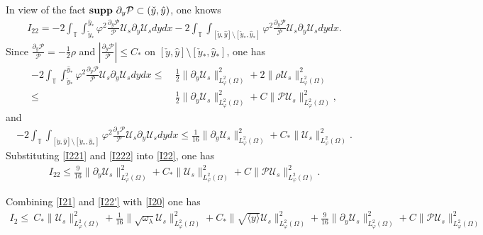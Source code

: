 \documentclass{amsart}
\numberwithin{equation}{section}
\newcommand\y{{{\langle y \rangle}}}
\begin{document}
In view of the fact ${\bf supp}~\partial_{y}\mathcal{P}\subset(\check{y},\hat{y})$, one knows
\begin{align}\label{I22}
I_{22}
=-2\int_{\mathbb{T}}\int_{\check{y}_{*}}^{\hat{y}_{*}}\varphi^{2}\frac{\partial_{y}\mathcal{P}}{\mathcal{P}}\mathcal{U}_{s}\partial_{y}\mathcal{U}_{s}dydx
 -2\int_{\mathbb{T}}\int_{[\check{y},\hat{y}]\setminus[\check{y}_{*},\hat{y}_{*}]}\varphi^{2}\frac{\partial_{y}\mathcal{P}}{\mathcal{P}}\mathcal{U}_{s}\partial_{y}\mathcal{U}_{s}dydx.
\end{align}
Since $\frac{\partial_{y}\mathcal{P}}{\mathcal{P}}=-\frac{1}{2}\rho$
and $\left|\frac{\partial_{y}\mathcal{P}}{\mathcal{P}}\right|\leq C_{*}$ on $[\check{y},\hat{y}]\setminus[\check{y}_{*},\hat{y}_{*}]$, one has
\begin{align}\label{I221}
-2\int_{\mathbb{T}}\int_{\check{y}_{*}}^{\hat{y}_{*}}\varphi^{2}\frac{\partial_{y}\mathcal{P}}{\mathcal{P}}\mathcal{U}_{s}\partial_{y}\mathcal{U}_{s}dydx
\leq&~\frac{1}{2}\|\partial_{y}\mathcal{U}_{s}\|_{L_{\varphi}^{2}(\Omega)}^{2}
     +2\|\rho\mathcal{U}_{s}\|_{L_{\varphi}^{2}(\Omega)}^{2}\\
\leq&~\frac{1}{2}\|\partial_{y}\mathcal{U}_{s}\|_{L_{\varphi}^{2}(\Omega)}^{2}
     +C\|\mathcal{P}\mathcal{U}_{s}\|_{L_{\varphi}^{2}(\Omega)}^{2},\nonumber
\end{align}
and
\begin{align}\label{I222}
-2\int_{\mathbb{T}}\int_{[\check{y},\hat{y}]\setminus[\check{y}_{*},\hat{y}_{*}]}\varphi^{2}\frac{\partial_{y}\mathcal{P}}{\mathcal{P}}\mathcal{U}_{s}\partial_{y}\mathcal{U}_{s}dydx
\leq \frac{1}{16}\|\partial_{y}\mathcal{U}_{s}\|_{L_{\varphi}^{2}(\Omega)}^{2}
    +C_{*}\|\mathcal{U}_{s}\|_{L_{\varphi}^{2}(\Omega)}^{2}.
\end{align}
Substituting \eqref{I221} and \eqref{I222} into \eqref{I22}, one has
\begin{align}\label{I22'}
I_{22}
\leq \frac{9}{16}\|\partial_{y}\mathcal{U}_{s}\|_{L_{\varphi}^{2}(\Omega)}^{2}
    +C_{*}\|\mathcal{U}_{s}\|_{L_{\varphi}^{2}(\Omega)}^{2}
    +C\|\mathcal{P}\mathcal{U}_{s}\|_{L_{\varphi}^{2}(\Omega)}^{2}.
\end{align}

Combining \eqref{I21} and \eqref{I22'} with \eqref{I20} one has
\begin{align*}
I_{2}
\leq~C_{*}\|\mathcal{U}_{s}\|_{L_{\varphi}^{2}(\Omega)}^{2}
    +\frac{1}{16}\|\sqrt{\omega_{\lambda}}\mathcal{U}_{s}\|_{L_{\varphi}^{2}(\Omega)}^{2}
    +C_{*}\|\sqrt{\y}\mathcal{U}_{s}\|_{L_{\varphi}^{2}(\Omega)}^{2}
    +\frac{9}{16}\|\partial_{y}\mathcal{U}_{s}\|_{L_{\varphi}^{2}(\Omega)}^{2}
    +C\|\mathcal{P}\mathcal{U}_{s}\|_{L_{\varphi}^{2}(\Omega)}^{2}
\end{align*}
\end{document}
